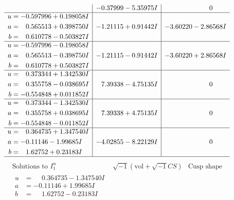 \documentclass[1p]{elsarticle_modified}
\theoremstyle{definition}
\newcommand{\I}{\sqrt{-1}}
\begin{document}
$$\begin{array}{c|c|c}
 & -0.37999 - 5.35975 I & \phantom{-0.000000 } 0 \\ \hline\begin{aligned}
u &= -0.597996 + 0.198058 I \\
a &= \phantom{-}0.565513 + 0.398750 I \\
b &= \phantom{-}0.610778 - 0.503827 I\end{aligned}
 & -1.21115 + 0.91442 I & -3.60220 - 2.86568 I \\ \hline\begin{aligned}
u &= -0.597996 - 0.198058 I \\
a &= \phantom{-}0.565513 - 0.398750 I \\
b &= \phantom{-}0.610778 + 0.503827 I\end{aligned}
 & -1.21115 - 0.91442 I & -3.60220 + 2.86568 I \\ \hline\begin{aligned}
u &= \phantom{-}0.373344 + 1.342530 I \\
a &= \phantom{-}0.355758 - 0.038695 I \\
b &= -0.554848 + 0.011852 I\end{aligned}
 & \phantom{-}7.39338 - 4.75135 I & \phantom{-0.000000 } 0 \\ \hline\begin{aligned}
u &= \phantom{-}0.373344 - 1.342530 I \\
a &= \phantom{-}0.355758 + 0.038695 I \\
b &= -0.554848 - 0.011852 I\end{aligned}
 & \phantom{-}7.39338 + 4.75135 I & \phantom{-0.000000 } 0 \\ \hline\begin{aligned}
u &= \phantom{-}0.364735 + 1.347540 I \\
a &= -0.11146 - 1.99685 I \\
b &= \phantom{-}1.62752 + 0.23183 I\end{aligned}
 & -4.02855 - 8.22129 I & \phantom{-0.000000 } 0\\
 \hline 
 \end{array}$$\newpage$$\begin{array}{c|c|c}  
\text{Solutions to }I^u_{1}& \I (\text{vol} + \sqrt{-1}CS) & \text{Cusp shape}\\
 \hline 
\begin{aligned}
u &= \phantom{-}0.364735 - 1.347540 I \\
a &= -0.11146 + 1.99685 I \\
b &= \phantom{-}1.62752 - 0.23183 I\end{aligned}

\end{array}$$
\end{document}

